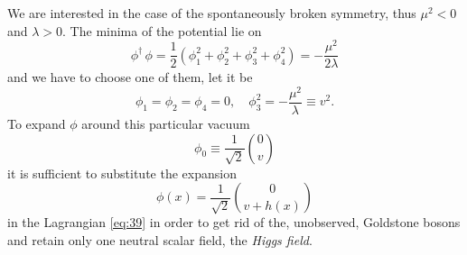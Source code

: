 We are interested in the case of the spontaneously broken symmetry,
thus $\mu^{2} < 0$ and $\lambda > 0$. The minima of the potential lie
on
\begin{equation}
  \label{eq:42}
  \phi^{\dagger}\,\phi = \frac{1}{2} (\phi_{1}^{2} + \phi_{2}^{2} +
  \phi_{3}^{2} + \phi_{4}^{2}) = - \frac{\mu^{2}}{2 \lambda}
\end{equation}
and we have to choose one of them, let it be
\begin{equation}
  \label{eq:44}
  \phi_{1} = \phi_{2} = \phi_{4} = 0, \quad \phi_{3}^{2} = -
  \frac{\mu^{2}}{\lambda} \equiv v^{2}.
\end{equation}
To expand $\phi$ around this particular vacuum
\begin{equation}
  \label{eq:43}
  \phi_{0} \equiv \frac{1}{\sqrt{2}} \binom{0}{v}
\end{equation}
it is sufficient to substitute the expansion
\begin{equation}
  \label{eq:45}
  \phi (x) = \frac{1}{\sqrt{2}} \binom{0}{v + h(x)}
\end{equation}
in the Lagrangian \eqref{eq:39} in order to get rid of the,
unobserved, Goldstone bosons and retain only one neutral scalar field,
the \emph{Higgs field}.


